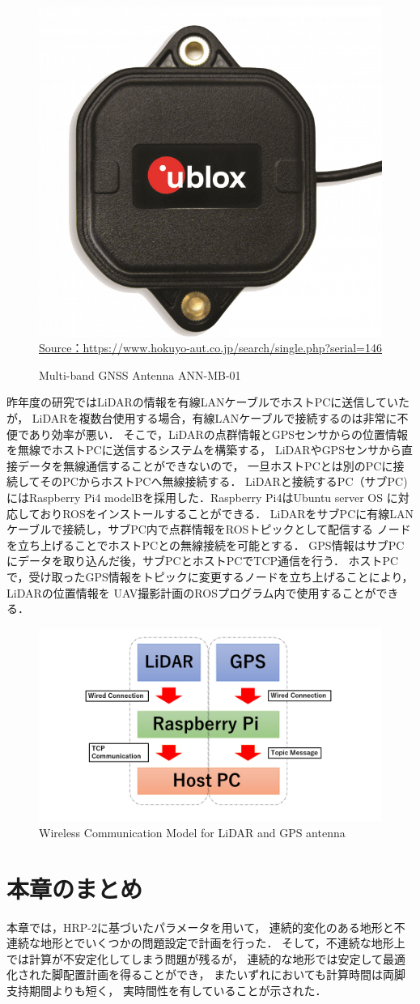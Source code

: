 \documentclass[autodetect-engine,dvipdfmx-if-dvi,ja=standard,a4j,jbase=11pt,magstyle=nomag*]{bxjsreport}
\begin{document}
\begin{figure}[b]
    \centering
    \includegraphics[width=0.6\linewidth, clip]{./figure/chapter4/GPS.png}
    \url{Source：https://www.hokuyo-aut.co.jp/search/single.php?serial=146}
    \caption{Multi-band GNSS Antenna ANN-MB-01}
    \label{fig:GPS}
\end{figure}

昨年度の研究ではLiDARの情報を有線LANケーブルでホストPCに送信していたが，
LiDARを複数台使用する場合，有線LANケーブルで接続するのは非常に不便であり効率が悪い．
そこで，LiDARの点群情報とGPSセンサからの位置情報を無線でホストPCに送信するシステムを構築する，
LiDARやGPSセンサから直接データを無線通信することができないので，
一旦ホストPCとは別のPCに接続してそのPCからホストPCへ無線接続する．
LiDARと接続するPC（サブPC)にはRaspberry Pi4 modelBを採用した．Raspberry Pi4はUbuntu server OS
に対応しておりROSをインストールすることができる．
LiDARをサブPCに有線LANケーブルで接続し，サブPC内で点群情報をROSトピックとして配信する
ノードを立ち上げることでホストPCとの無線接続を可能とする．
GPS情報はサブPCにデータを取り込んだ後，サブPCとホストPCでTCP通信を行う．
ホストPCで，受け取ったGPS情報をトピックに変更するノードを立ち上げることにより，LiDARの位置情報を
UAV撮影計画のROSプログラム内で使用することができる．

\begin{figure}[b]
    \centering
    \includegraphics[width=0.6\linewidth, clip]{./figure/chapter4/wireless_model.png}
    \caption{Wireless Communication Model for LiDAR and GPS antenna}
    \label{fig:wireless_model}
\end{figure}

\section{本章のまとめ}
本章では，HRP-2に基づいたパラメータを用いて，
連続的変化のある地形と不連続な地形とでいくつかの問題設定で計画を行った．
そして，不連続な地形上では計算が不安定化してしまう問題が残るが，
連続的な地形では安定して最適化された脚配置計画を得ることができ，
またいずれにおいても計算時間は両脚支持期間よりも短く，
実時間性を有していることが示された．
\end{document}
